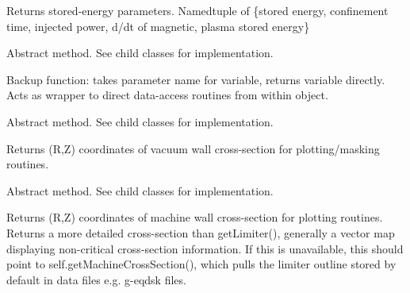 \documentclass[letterpaper,10pt,english]{sphinxmanual}
\begin{document}
\begin{fulllineitems}
\begin{fulllineitems}
Returns stored-energy parameters.
Namedtuple of \{stored energy, confinement time, injected power, d/dt of magnetic, plasma stored energy\}

\end{fulllineitems}


\begin{fulllineitems}
\label{\detokenize{eqtools:eqtools.core.Equilibrium.getParam}}
Abstract method.  See child classes for implementation.

Backup function: takes parameter name for variable, returns variable directly.
Acts as wrapper to direct data-access routines from within object.

\end{fulllineitems}


\begin{fulllineitems}
\label{\detokenize{eqtools:eqtools.core.Equilibrium.getMachineCrossSection}}
Abstract method.  See child classes for implementation.

Returns (R,Z) coordinates of vacuum wall cross-section for plotting/masking routines.

\end{fulllineitems}


\begin{fulllineitems}
\label{\detokenize{eqtools:eqtools.core.Equilibrium.getMachineCrossSectionFull}}
Abstract method.  See child classes for implementation.

Returns (R,Z) coordinates of machine wall cross-section for plotting routines.
Returns a more detailed cross-section than getLimiter(), generally a vector map
displaying non-critical cross-section information.  If this is unavailable, this
should point to self.getMachineCrossSection(), which pulls the limiter outline
stored by default in data files e.g. g-eqdsk files.


\end{fulllineitems}
\end{fulllineitems}
\end{document}
